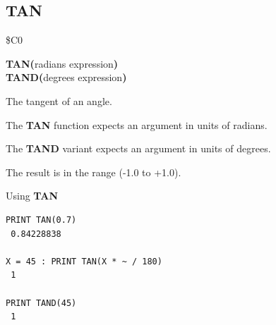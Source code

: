 \subsection{TAN}
\begin{description}[leftmargin=2cm,style=nextline]
\item [Token:]    \$C0

\item [Format:]   {\bf TAN(}radians expression{\bf )} \\
                  {\bf TAND(}degrees expression{\bf )}

\item [Returns:]  The tangent of an angle.

                  The {\bf TAN} function expects an argument in units of radians.

                  The {\bf TAND} variant expects an argument in units of degrees.

                  The result is in the range (-1.0 to +1.0).

\item [Example:]  Using {\bf TAN}

\begin{tcolorbox}[colback=black,coltext=white]
\verbatimfont{\codefont}
\begin{verbatim}
PRINT TAN(0.7)
 0.84228838

X = 45 : PRINT TAN(X * ~ / 180)
 1

PRINT TAND(45)
 1
\end{verbatim}
\end{tcolorbox}
\end{description}


\newpage
